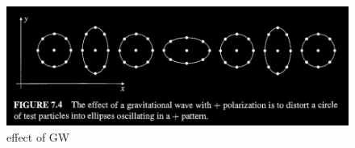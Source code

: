 \begin{figure}[h]
\centering
\includegraphics[width=\linewidth]{imm/gweffect.png}
\caption{effect of GW}
\label{imm:gweffect.png}
\end{figure}


















